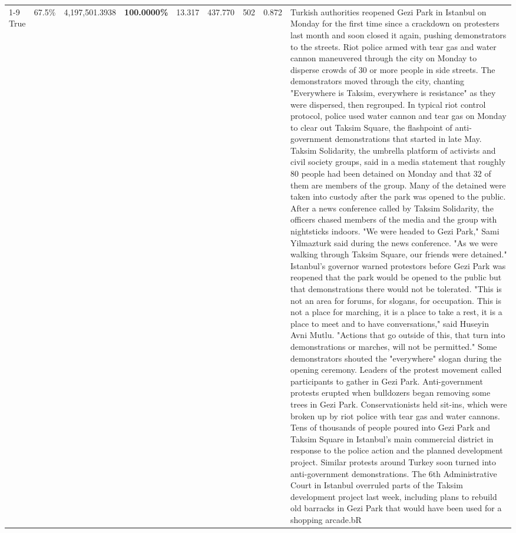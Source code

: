 \begin{table}[H]
\begin{tabular}{lllrlllll}
\cline{1-9}
True & 67.5\% & 4,197,501.3938 & \bfseries \color{red} 100.0000\% & 13.317 & 437.770 & 502 & 0.872 & Turkish authorities reopened Gezi Park in Istanbul on Monday for the first time since a crackdown on protesters last month and soon closed it again, pushing demonstrators to the streets. Riot police armed with tear gas and water cannon maneuvered through the city on Monday to disperse crowds of 30 or more people in side streets. The demonstrators moved through the city, chanting "Everywhere is Taksim, everywhere is resistance" as they were dispersed, then regrouped. In typical riot control protocol, police used water cannon and tear gas on Monday to clear out Taksim Square, the flashpoint of anti-government demonstrations that started in late May. Taksim Solidarity, the umbrella platform of activists and civil society groups, said in a media statement that roughly 80 people had been detained on Monday and that 32 of them are members of the group. Many of the detained were taken into custody after the park was opened to the public. After a news conference called by Taksim Solidarity, the officers chased members of the media and the group with nightsticks indoors. "We were headed to Gezi Park," Sami Yilmazturk said during the news conference. "As we were walking through Taksim Square, our friends were detained." Istanbul's governor warned protestors before Gezi Park was reopened that the park would be opened to the public but that demonstrations there would not be tolerated. "This is not an area for forums, for slogans, for occupation. This is not a place for marching, it is a place to take a rest, it is a place to meet and to have conversations," said Huseyin Avni Mutlu. "Actions that go outside of this, that turn into demonstrations or marches, will not be permitted." Some demonstrators shouted the "everywhere" slogan during the opening ceremony. Leaders of the protest movement called participants to gather in Gezi Park. Anti-government protests erupted when bulldozers began removing some trees in Gezi Park. Conservationists held sit-ins, which were broken up by riot police with tear gas and water cannons. Tens of thousands of people poured into Gezi Park and Taksim Square in Istanbul's main commercial district in response to the police action and the planned development project. Similar protests around Turkey soon turned into anti-government demonstrations. The 6th Administrative Court in Istanbul overruled parts of the Taksim development project last week, including plans to rebuild old barracks in Gezi Park that would have been used for a shopping arcade.bR \\

\end{tabular}
\end{table}

